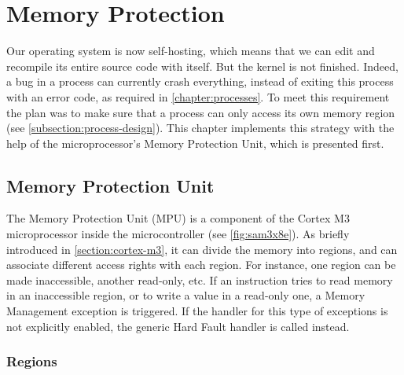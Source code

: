 
\renewcommand{\rustfile}{chapter6}
\setcounter{rustid}{0}


\chapter{Memory Protection}\label{chapter:memory-protection}

Our operating system is now self-hosting, which means that we can edit and
recompile its entire source code with itself. But the kernel is not finished.
Indeed, a bug in a process can currently crash everything, instead of exiting
this process with an error code, as required in \cref{chapter:processes}. To
meet this requirement the plan was to make sure that a process can only access
its own memory region (see \cref{subsection:process-design}). This chapter
implements this strategy with the help of the microprocessor's Memory
Protection Unit, which is presented first.

\section{Memory Protection Unit}

The Memory Protection Unit (MPU) is a component of the Cortex M3 microprocessor
inside the microcontroller (see \cref{fig:sam3x8e}). As briefly introduced in
\cref{section:cortex-m3}, it can divide the memory into regions, and can
associate different access rights with each region. For instance, one region
can be made inaccessible, another read-only, etc. If an instruction tries to
read memory in an inaccessible region, or to write a value in a read-only one,
a Memory Management exception is triggered. If the handler for this type of
exceptions is not explicitly enabled, the generic Hard Fault handler is called
instead.

\subsection{Regions}

